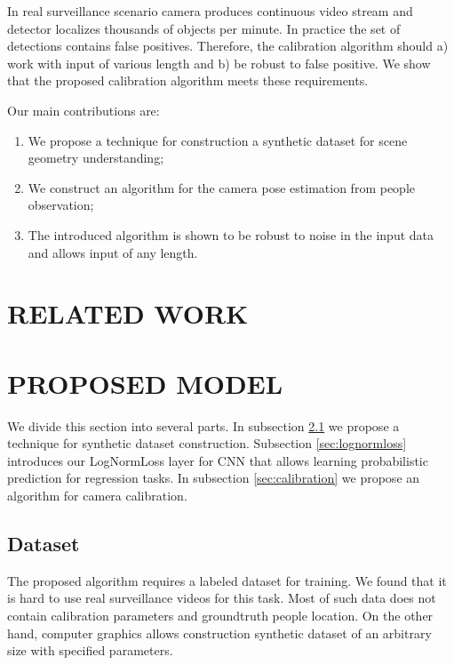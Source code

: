 In real surveillance scenario camera produces continuous video stream and detector localizes thousands of objects per minute. In practice the set of detections contains false positives. Therefore, the calibration algorithm should a) work with input of various length and b) be robust to false positive. We show that the proposed calibration algorithm meets these requirements.

Our main contributions are:
\begin{enumerate}
	\item We propose a technique for construction a synthetic dataset for scene geometry understanding;
	\item We construct an algorithm for the camera pose estimation from people observation;
	\item The introduced algorithm is shown to be robust to noise in the input data and allows input of any length.
\end{enumerate}

\section{\uppercase{Related Work}}
\label{sec:related}

\noindent 

\section{\uppercase{Proposed Model}}
\label{sec:proposed}

\noindent We divide this section into several parts. In subsection \ref{sec:dataset} we propose a technique for synthetic dataset construction. Subsection \ref{sec:lognormloss} introduces our LogNormLoss layer for CNN that allows learning probabilistic prediction for regression tasks. In subsection \ref{sec:calibration} we propose an algorithm for camera calibration.

\subsection{Dataset}
\label{sec:dataset}

\noindent The proposed algorithm requires a labeled dataset for training. We found that it is hard to use real surveillance videos for this task. Most of such data does not contain calibration parameters and groundtruth people location. On the other hand, computer graphics allows construction synthetic dataset of an arbitrary size with specified parameters.

